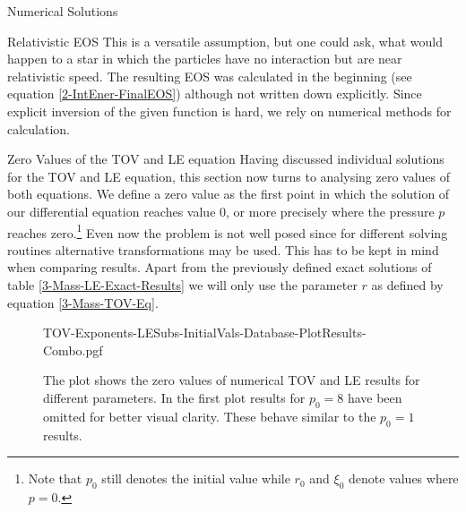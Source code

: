 \begin{section}{Numerical Solutions}
\begin{subsection}{Relativistic EOS}
This is a versatile assumption, but one could ask, what would happen to a star in which the particles have no interaction but are near relativistic speed. The resulting EOS was calculated in the beginning (see equation \eqref{2-IntEner-FinalEOS}) although not written down explicitly. 
Since explicit inversion of the given function is hard, we rely on numerical methods for calculation.
\end{subsection}
%
%
\begin{subsection}{Zero Values of the TOV and LE equation}
Having discussed individual solutions for the \ac{TOV} and \ac{LE} equation, this section now turns to analysing zero values of both equations.
We define a zero value as the first point in which the solution of our differential equation reaches value $0$, or more precisely where the pressure $p$ reaches zero.\footnote{Note that $p_0$ still denotes the initial value while $r_0$ and $\xi_0$ denote values where $p=0$.}
Even now the problem is not well posed since for different solving routines alternative transformations may be used.
This has to be kept in mind when comparing results. 
Apart from the previously defined exact solutions of table \ref{3-Mass-LE-Exact-Results} we will only use the parameter $r$ as defined by equation \eqref{3-Mass-TOV-Eq}.
\begin{figure}[H]
	\centering
	{TOV-Exponents-LESubs-InitialVals-Database-PlotResults-Combo.pgf}
	\label{4-NumSol-TOV-Exponents-Const-p0}
	\caption[Zero Values of TOV and LE equation]{The plot shows the zero values of numerical \ac{TOV} and \ac{LE} results for different parameters. 
	In the first plot results for $p_0=8$ have been omitted for better visual clarity. These behave similar to the $p_0=1$ results.}
\end{figure}


\end{subsection}
%
%
\end{section}
